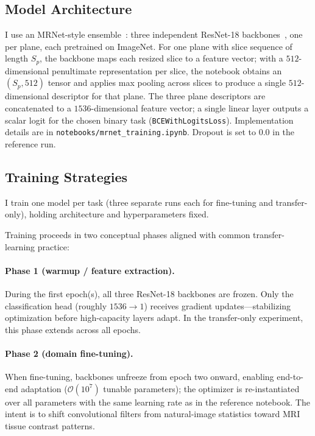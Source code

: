 \documentclass[10pt,twocolumn]{article}
\begin{document}
\subsection{Model Architecture}

I use an MRNet-style ensemble~\cite{bien2020deep}: three independent ResNet-18 backbones~\cite{he2016deep,torchvision}, one per plane, each pretrained on ImageNet. For one plane with slice sequence of length $S_{p}$, the backbone maps each resized slice to a feature vector; with a $512$-dimensional penultimate representation per slice, the notebook obtains an $(S_{p},512)$ tensor and applies max pooling across slices to produce a single $512$-dimensional descriptor for that plane. The three plane descriptors are concatenated to a $1536$-dimensional feature vector; a single linear layer outputs a scalar logit for the chosen binary task (\texttt{BCEWithLogitsLoss}). Implementation details are in \texttt{notebooks/mrnet\_training.ipynb}. Dropout is set to $0.0$ in the reference run.

\subsection{Training Strategies}

I train one model per task (three separate runs each for fine-tuning and transfer-only), holding architecture and hyperparameters fixed.

Training proceeds in two conceptual phases aligned with common transfer-learning practice:

\paragraph{Phase 1 (warmup / feature extraction).}
During the first epoch(s), all three ResNet-18 backbones are frozen. Only the classification head (roughly $1536 \rightarrow 1$) receives gradient updates---stabilizing optimization before high-capacity layers adapt. In the transfer-only experiment, this phase extends across all epochs.

\paragraph{Phase 2 (domain fine-tuning).}
When fine-tuning, backbones unfreeze from epoch two onward, enabling end-to-end adaptation ($\mathcal{O}(10^{7})$ tunable parameters); the optimizer is re-instantiated over all parameters with the same learning rate as in the reference notebook. The intent is to shift convolutional filters from natural-image statistics toward MRI tissue contrast patterns.
\end{document}

